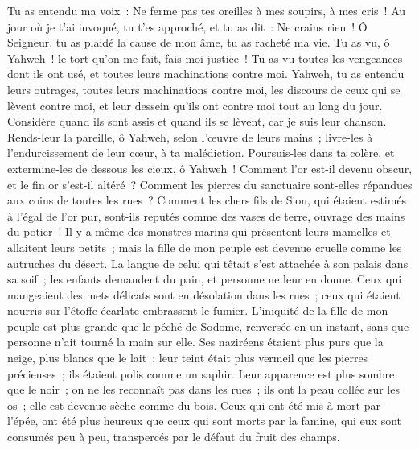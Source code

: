 \begin{multicols}{2}
Tu as entendu ma voix~: Ne ferme pas tes oreilles à mes soupirs, à mes cris~!
Au jour où je t'ai invoqué, tu t'es approché, et tu as dit~: Ne crains rien~!
 Ô Seigneur, tu as plaidé la cause de mon âme, tu as racheté ma vie.
Tu as vu, ô Yahweh~! le tort qu'on me fait, fais-moi justice~!
Tu as vu toutes les vengeances dont ils ont usé, et toutes leurs machinations contre moi.
 Yahweh, tu as entendu leurs outrages, toutes leurs machinations contre moi,
les discours de ceux qui se lèvent contre moi, et leur dessein qu'ils ont contre moi tout au long du jour.
Considère quand ils sont assis et quand ils se lèvent, car je suis leur chanson.
 Rends-leur la pareille, ô Yahweh, selon l'œuvre de leurs mains~;
livre-les à l'endurcissement de leur cœur, à ta malédiction.
Poursuis-les dans ta colère, et extermine-les de dessous les cieux, ô Yahweh~!
\VerseOne{} Comment l'or est-il devenu obscur, et le fin or s'est-il altéré~? Comment les pierres du sanctuaire sont-elles répandues aux coins de toutes les rues~?
 Comment les chers fils de Sion, qui étaient estimés à l'égal de l'or pur, sont-ils reputés comme des vases de terre, ouvrage des mains du potier~!
 Il y a même des monstres marins qui présentent leurs mamelles et allaitent leurs petits~; mais la fille de mon peuple est devenue cruelle comme les autruches du désert.
 La langue de celui qui têtait s'est attachée à son palais dans sa soif~; les enfants demandent du pain, et personne ne leur en donne.
 Ceux qui mangeaient des mets délicats sont en désolation dans les rues~; ceux qui étaient nourris sur l'étoffe écarlate embrassent le fumier.
 L'iniquité de la fille de mon peuple est plus grande que le péché de Sodome, renversée en un instant, sans que personne n'ait tourné la main sur elle.
 Ses naziréens étaient plus purs que la neige, plus blancs que le lait~; leur teint était plus vermeil que les pierres précieuses~; ils étaient polis comme un saphir.
 Leur apparence est plus sombre que le noir~; on ne les reconnaît pas dans les rues~; ils ont la peau collée sur les os~; elle est devenue sèche comme du bois.
 Ceux qui ont été mis à mort par l'épée, ont été plus heureux que ceux qui sont morts par la famine, qui eux sont consumés peu à peu, transpercés par le défaut du fruit des champs.

\end{multicols}
